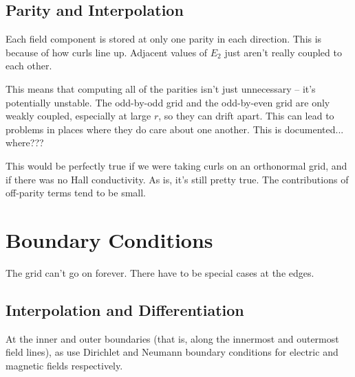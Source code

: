 \subsection{Parity and Interpolation}

Each field component is stored at only one parity in each direction. This is because of how curls line up. Adjacent values of $E_2$ just aren't really coupled to each other. 

This means that computing all of the parities isn't just unnecessary -- it's potentially unstable. The odd-by-odd grid and the odd-by-even grid are only weakly coupled, especially at large $r$, so they can drift apart. This can lead to problems in places where they do care about one another. This is documented... where??? 

This would be perfectly true if we were taking curls on an orthonormal grid, and if there was no Hall conductivity. As is, it's still pretty true. The contributions of off-parity terms tend to be small. 

\section{Boundary Conditions}

The grid can't go on forever. There have to be special cases at the edges. 

\subsection{Interpolation and Differentiation}

At the inner and outer boundaries (that is, along the innermost and outermost field lines), as use Dirichlet and Neumann boundary conditions for electric and magnetic fields respectively. 

